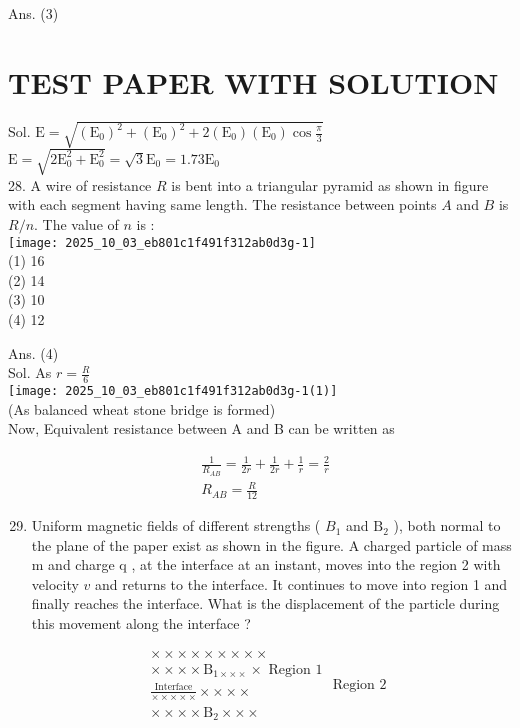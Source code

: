 \documentclass[10pt]{article}
\begin{document}
Ans. (3)

\section*{TEST PAPER WITH SOLUTION}
Sol. \(\mathrm{E}=\sqrt{\left(\mathrm{E}_{0}\right)^{2}+\left(\mathrm{E}_{0}\right)^{2}+2\left(\mathrm{E}_{0}\right)\left(\mathrm{E}_{0}\right) \cos \frac{\pi}{3}}\)\\
\(\mathrm{E}=\sqrt{2 \mathrm{E}_{0}^{2}+\mathrm{E}_{0}^{2}}=\sqrt{3} \mathrm{E}_{0}=1.73 \mathrm{E}_{0}\)\\
28. A wire of resistance \(R\) is bent into a triangular pyramid as shown in figure with each segment having same length. The resistance between points \(A\) and \(B\) is \(R / n\). The value of \(n\) is :\\
\texttt{[image: 2025\_10\_03\_eb801c1f491f312ab0d3g-1]}\\
(1) 16\\
(2) 14\\
(3) 10\\
(4) 12

Ans. (4)\\
Sol. As \(r=\frac{R}{6}\)\\
\texttt{[image: 2025\_10\_03\_eb801c1f491f312ab0d3g-1(1)]}\\
(As balanced wheat stone bridge is formed)\\
Now, Equivalent resistance between A and B can be written as

\[
\begin{aligned}
& \frac{1}{R_{A B}}=\frac{1}{2 r}+\frac{1}{2 r}+\frac{1}{r}=\frac{2}{r} \\
& R_{A B}=\frac{R}{12}
\end{aligned}
\]

\begin{enumerate}
  \setcounter{enumi}{28}
  \item Uniform magnetic fields of different strengths ( \(B_{1}\) and \(\mathrm{B}_{2}\) ), both normal to the plane of the paper exist as shown in the figure. A charged particle of mass m and charge q , at the interface at an instant, moves into the region 2 with velocity \(v\) and returns to the interface. It continues to move into region 1 and finally reaches the interface. What is the displacement of the particle during this movement along the interface ?
\end{enumerate}

\[
\begin{aligned}
& \times \times \times \times \times \times \times \times \times \\
& \times \times \times \times \mathrm{B}_{1 \times \times \times} \times \text { Region } 1 \\
& \frac{\mathrm{Interface}}{\times \times \times \times \times} \times \times \times \times \\
& \times \times \times \times \mathrm{B}_{2} \times \times \times
\end{aligned} \text { Region } 2
\]
\end{document}
